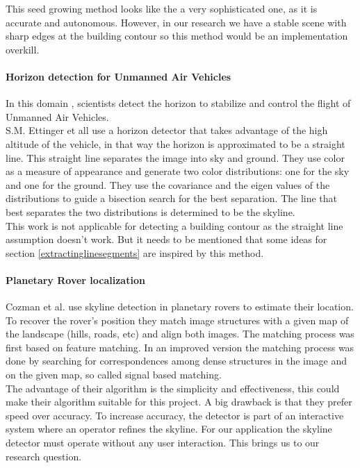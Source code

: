 This seed growing method looks like the a very sophisticated one, as it is
accurate and autonomous. However, in our research we have a stable scene with
sharp edges at the building contour so this method would be an implementation
overkill. 


\paragraph{Horizon detection for Unmanned Air Vehicles}
In this domain \cite{Guidedflight}, scientists detect the horizon to stabilize and control the
flight of Unmanned Air Vehicles.\\  
S.M. Ettinger et all \cite{Guidedflight} use a horizon detector that takes
advantage of the high altitude of the vehicle, in that way the horizon is
approximated to be a straight line. 
This straight line separates the image into sky and ground. They use color as
a measure of appearance and generate two color distributions: one for the sky
and one for the ground. They use the covariance and the eigen values of the
distributions to guide a bisection search for the best separation. The line that
best separates the two distributions is determined to be the skyline.\\

This work is not applicable for detecting a building contour as the straight
line assumption doesn't work. But it needs to be mentioned that some ideas for
section \ref{extractinglinesegments} are inspired by this method.

\paragraph{Planetary Rover localization}
Cozman et al. \cite{Rover} use skyline detection in planetary rovers to estimate 
their location. 
To recover the rover's position they match image structures with a given map
of the landscape (hills, roads, etc) and align both images.
The matching process was first based on feature matching. In an improved version
the matching process was done by searching for correspondences among dense
structures in the image and on the given map, so called signal based matching.\\
The advantage of their algorithm is the simplicity and effectiveness, this
could make their algorithm suitable for this project. A big drawback is that
they prefer speed over accuracy. To increase accuracy, the detector is part
of an interactive system where an operator refines the skyline. For our
application the skyline detector must operate without any user interaction.
This brings us to our research question.

